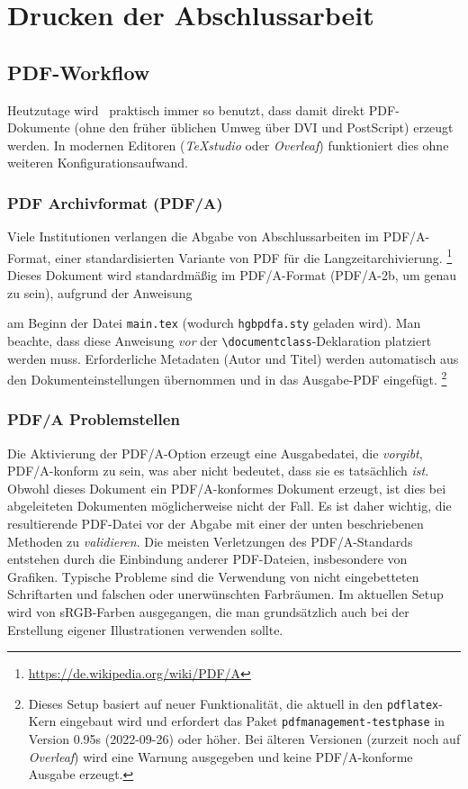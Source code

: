 \chapter{Drucken der Abschlussarbeit}
\label{cha:Drucken}


\section{PDF-Workflow}
\label{sec:pdf}

Heutzutage wird \latex\ praktisch immer so benutzt, dass damit direkt PDF-Dokumente
(ohne den früher üblichen Umweg über DVI und PostScript) erzeugt werden.
In modernen Editoren (\zB \emph{TeXstudio} oder \emph{Overleaf}) funktioniert dies
ohne weiteren Konfigurationsaufwand.


\subsection{PDF Archivformat (PDF/A)}
\label{sec:PDFA}

Viele Institutionen verlangen die Abgabe von Abschlussarbeiten im PDF/A-Format, einer
standardisierten Variante von PDF für die Langzeitarchivierung.%
\footnote{\url{https://de.wikipedia.org/wiki/PDF/A}}
Dieses Dokument wird standardmäßig im PDF/A-Format (PDF/A-2b, um genau zu sein),
aufgrund der Anweisung
%
\begin{LaTeXCode}[numbers=none]
\RequirePackage{hgbpdfa}
\end{LaTeXCode}
%
am Beginn der Datei \verb!main.tex! (wodurch \verb!hgbpdfa.sty! geladen wird).
Man beachte, dass diese Anweisung \emph{vor} der \verb!\documentclass!-Deklaration
platziert werden muss. Erforderliche Meta\-daten (\zB Autor und Titel) werden
automatisch aus den Dokumenteinstellungen übernommen und in das Ausgabe-PDF eingefügt.%
\footnote{Dieses Setup basiert auf neuer Funktionalität, die aktuell in den
\texttt{pdflatex}-Kern eingebaut wird und erfordert das Paket 
\texttt{pdfmanagement-testphase} in Version 0.95s (2022-09-26) oder höher.
Bei älteren Versionen (\zB zurzeit noch auf \emph{Overleaf}) wird eine Warnung
ausgegeben und keine PDF/A-konforme Ausgabe erzeugt.}


\subsection{PDF/A Problemstellen}
\label{sec:PDFA-issues}

Die Aktivierung der PDF/A-Option erzeugt eine Ausgabedatei, die \emph{vorgibt},
PDF/A-konform zu sein, was aber nicht bedeutet, dass sie es tatsächlich \emph{ist}.
Obwohl dieses Dokument ein PDF/A-konformes Dokument erzeugt, ist dies bei abgeleiteten
Dokumenten möglicherweise nicht der Fall. Es ist daher wichtig, die resultierende
PDF-Datei vor der Abgabe mit einer der unten beschriebenen Methoden zu 
\emph{validieren}. Die meisten Verletzungen des PDF/A-Standards entstehen durch 
die Einbindung anderer PDF-Dateien, insbesondere von Grafiken. Typische Probleme 
sind die Verwendung von nicht eingebetteten Schriftarten und falschen oder 
unerwünschten Farbräumen. Im aktuellen Setup wird von sRGB-Farben ausgegangen, die man
grundsätzlich auch bei der Erstellung eigener Illustrationen verwenden sollte.

